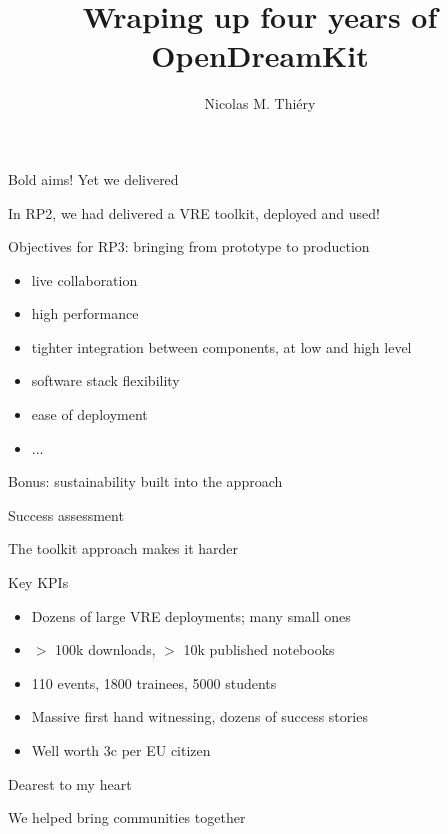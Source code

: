 \documentclass[svgnames]{beamer}
\author{Nicolas M. Thiéry}
\title{Wraping up four years of OpenDreamKit}
\newcommand{\greencheckmark}{\scalebox{1.5}{\color{DarkGreen}\checkmark}}
\begin{document}
\begin{frame}
  \titlepage
\end{frame}

\begin{frame}{Bold aims! Yet we delivered}

  In RP2, we had delivered a VRE toolkit\pause, deployed and used!
  \bigskip\pause

  \begin{block}{Objectives for RP3: bringing from prototype to production}
    \begin{itemize}
    \item \greencheckmark live collaboration
    \item \greencheckmark high performance
    \item \greencheckmark tighter integration between components, at low and high level
    \item \greencheckmark software stack flexibility
    \item \greencheckmark ease of deployment
    \item \greencheckmark  ...
    \end{itemize}
  \end{block}
  \bigskip\pause

  \begin{block}{Bonus: sustainability built into the approach}
  \end{block}
\end{frame}


\begin{frame}{Success assessment}

  The toolkit approach makes it harder\bigskip
  \pause
  \begin{block}{Key KPIs}
    \begin{itemize}
    \item Dozens of large VRE deployments; many small ones
    \item $>$ 100k downloads, $>$ 10k published notebooks
    \item 110 events, 1800 trainees, 5000 students
    \item Massive first hand witnessing, dozens of success stories
    \item Well worth 3c per EU citizen
    \end{itemize}
  \end{block}
  \pause

  \begin{block}{Dearest to my heart}\pause
    \bigskip
    \centerline{We helped bring communities together}
  \end{block}
\end{frame}
\end{document}
